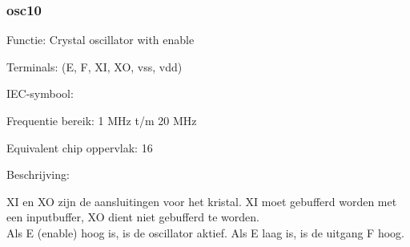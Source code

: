 \subsubsection{osc10}

Functie: Crystal oscillator with enable

Terminals: (E, F, XI, XO, vss, vdd)


IEC-symbool:
\begin{figure}[bth]
\end{figure}

Frequentie bereik: 1 MHz t/m 20 MHz

Equivalent chip oppervlak: 16



Beschrijving:

XI en XO zijn de aansluitingen voor het kristal. XI moet gebufferd worden met een inputbuffer, XO dient niet gebufferd te worden.\\
Als E (enable) hoog is, is de oscillator aktief. Als E laag is, is de uitgang F hoog.\\
\\
\\

\clearpage




